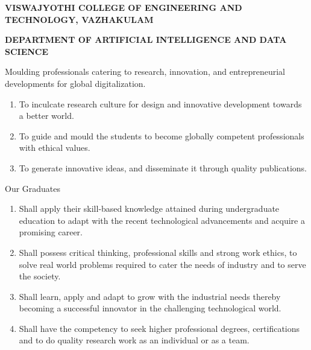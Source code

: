 \documentclass[12pt,a4paper]{report}
\begin{document}
\clearpage
\pagestyle{empty}
\begin{center}
    {\large\bfseries VISWAJYOTHI COLLEGE OF ENGINEERING AND TECHNOLOGY, VAZHAKULAM}
    \par\vspace{0.2cm}
    {\large\bfseries DEPARTMENT OF ARTIFICIAL INTELLIGENCE AND DATA SCIENCE}
    \par\vspace{0.6cm}
\end{center}

\par\vspace{0.2cm}
\noindent Moulding professionals catering to research, innovation, and entrepreneurial
developments for global digitalization.

\vspace{0.6cm}
\par\vspace{0.2cm}
\begin{enumerate}[leftmargin=*, label=\arabic*.]
    \item To inculcate research culture for design and innovative development towards a better world.
    \item To guide and mould the students to become globally competent professionals with ethical values.
    \item To generate innovative ideas, and disseminate it through quality publications.
\end{enumerate}

\vspace{0.5cm}
\par\vspace{0.2cm}
\noindent Our Graduates
\begin{enumerate}[leftmargin=*, label=\arabic*.]
    \item Shall apply their skill-based knowledge attained during undergraduate education to adapt with the recent technological advancements and acquire a promising career.
    \item Shall possess critical thinking, professional skills and strong work ethics, to solve real world problems required to cater the needs of industry and to serve the society.
    \item Shall learn, apply and adapt to grow with the industrial needs thereby becoming a successful innovator in the challenging technological world.
    \item Shall have the competency to seek higher professional degrees, certifications and to do quality research work as an individual or as a team.
\end{enumerate}
\clearpage
\end{document}
